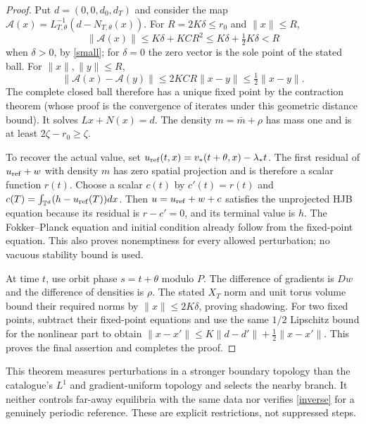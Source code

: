 \documentclass[11pt]{article}
\newcommand{\T}{\mathbb T}
\begin{document}
\begin{proof}
Put $d=(0,0,d_0,d_T)$ and consider the map
$\mathcal A(x)=L_{T,\theta}^{-1}(d-N_{T,\theta}(x))$.
For $R=2K\delta\leq r_0$ and $\|x\|\leq R$,
\[
 \|\mathcal A(x)\|\leq K\delta+KCR^2
 \leq K\delta+\tfrac12K\delta<R
\]
when $\delta>0$, by \eqref{small}; for $\delta=0$ the zero vector
is the sole point of the stated ball. For $\|x\|,\|y\|\leq R$,
\[
 \|\mathcal A(x)-\mathcal A(y)\|
 \leq2KCR\|x-y\|\leq\tfrac12\|x-y\|.
\]
The complete closed ball therefore has a unique fixed point by the
contraction theorem (whose proof is the convergence of iterates under
this geometric distance bound). It solves $Lx+N(x)=d$.
The density $m=\bar m+\rho$ has mass one and is at least
$2\zeta-r_0\geq\zeta$.

To recover the actual value, set
$u_{\rm ref}(t,x)=v_*(t+\theta,x)-\lambda_*t$.
The first residual of $u_{\rm ref}+w$ with density $m$ has zero
spatial projection and is therefore a scalar function $r(t)$.
Choose a scalar $c(t)$ by
$c'(t)=r(t)$ and
$c(T)=\int_{\T^d}(h-u_{\rm ref}(T))dx$.
Then $u=u_{\rm ref}+w+c$ satisfies the unprojected HJB equation
because its residual is $r-c'=0$, and its terminal value is $h$.
The Fokker--Planck equation and initial condition already follow from
the fixed-point equation. This also proves nonemptiness for every
allowed perturbation; no vacuous stability bound is used.

At time $t$, use orbit phase $s=t+\theta$ modulo $P$.
The difference of gradients is $Dw$ and the difference of densities is
$\rho$. The stated $X_T$ norm and unit torus volume bound their required
norms by $\|x\|\leq2K\delta$, proving shadowing.
For two fixed points, subtract their fixed-point equations and use the
same $1/2$ Lipschitz bound for the nonlinear part to obtain
$\|x-x'\|\leq K\|d-d'\|+\tfrac12\|x-x'\|$.
This proves the final assertion and completes the proof.
\end{proof}

This theorem measures perturbations in a stronger boundary topology than
the catalogue's $L^1$ and gradient-uniform topology and selects the nearby
branch. It neither controls far-away equilibria with the same data nor
verifies \eqref{inverse} for a genuinely periodic reference. These are
explicit restrictions, not suppressed steps.
\end{document}
